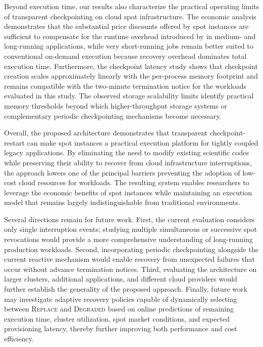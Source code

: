 \documentclass[conference]{IEEEtran}
\begin{document}
Beyond execution time, our results also characterize the practical operating limits of transparent checkpointing on cloud spot infrastructure. The economic analysis demonstrates that the substantial price discounts offered by spot instances are sufficient to compensate for the runtime overhead introduced by \MANA in medium- and long-running applications, while very short-running jobs remain better suited to conventional on-demand execution because recovery overhead dominates total execution time. Furthermore, the checkpoint latency study shows that checkpoint creation scales approximately linearly with the per-process memory footprint and remains compatible with the two-minute \AWS termination notice for the workloads evaluated in this study. The observed storage scalability limits identify practical memory thresholds beyond which higher-throughput storage systems or complementary periodic checkpointing mechanisms become necessary.

Overall, the proposed architecture demonstrates that transparent checkpoint-restart can make spot instances a practical execution platform for tightly coupled legacy \MPI applications. By eliminating the need to modify existing scientific codes while preserving their ability to recover from cloud infrastructure interruptions, the approach lowers one of the principal barriers preventing the adoption of low-cost cloud resources for \HPC workloads. The resulting system enables researchers to leverage the economic benefits of spot instances while maintaining an execution model that remains largely indistinguishable from traditional \HPC environments.

Several directions remain for future work. First, the current evaluation considers only single interruption events; studying multiple simultaneous or successive spot revocations would provide a more comprehensive understanding of long-running production workloads. Second, incorporating periodic checkpointing alongside the current reactive mechanism would enable recovery from unexpected failures that occur without advance termination notices. Third, evaluating the architecture on larger clusters, additional \MPI applications, and different cloud providers would further establish the generality of the proposed approach. Finally, future work may investigate adaptive recovery policies capable of dynamically selecting between \textsc{Replace} and \textsc{Degraded} based on online predictions of remaining execution time, cluster utilization, spot market conditions, and expected provisioning latency, thereby further improving both performance and cost efficiency.



\end{document}
